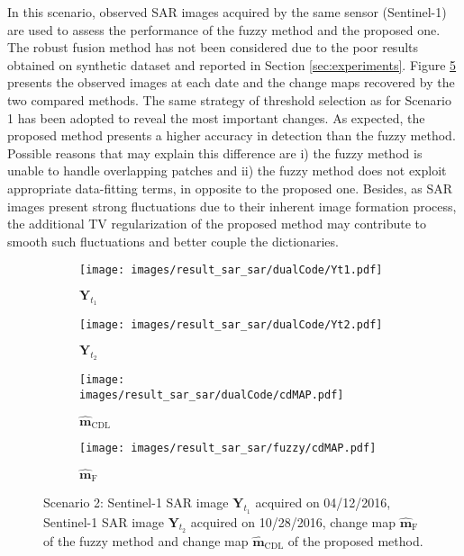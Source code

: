 \documentclass[review]{elsarticle}
\begin{document}
In this scenario, observed SAR images acquired by the same sensor (Sentinel-1) are used to assess the performance of the fuzzy method and the proposed one. The robust fusion method has not been considered due to the poor results obtained on synthetic dataset and reported in Section \ref{sec:experiments}. Figure \ref{fig:realS1S1} presents the observed images at each date and the change maps recovered by the two compared methods. The same strategy of threshold selection as for Scenario 1 has been adopted to reveal the most important changes. As expected, the proposed method presents a higher accuracy in detection than the fuzzy method. Possible reasons that may explain this difference are i) the fuzzy method is unable to handle overlapping patches and ii) the fuzzy method does not exploit appropriate data-fitting terms, in opposite to the proposed one. Besides, as SAR images present strong fluctuations due to their inherent image formation process, the additional TV regularization of the proposed method may contribute to smooth such fluctuations and better couple the dictionaries.

	\begin{figure}[h!]
		\centering
			\begin{subfigure}{\subfwidth}
					\centering
					\texttt{[image: images/result\_sar\_sar/dualCode/Yt1.pdf]}
					\caption{$\mathbf{Y}_{t_1}$}
					\label{fig:s1s1Yt1}
			\end{subfigure}
			\begin{subfigure}{\subfwidth}
					\centering
					\texttt{[image: images/result\_sar\_sar/dualCode/Yt2.pdf]}
					\caption{$\mathbf{Y}_{t_2}$}
					\label{fig:s1s1Yt2}
			\end{subfigure}
			\begin{subfigure}{\subfwidth}
					\centering
					\texttt{[image: images/result\_sar\_sar/dualCode/cdMAP.pdf]}
					\caption{$\hat{\mathbf{m}}_{\mathrm{CDL}}$}
					\label{fig:s1s1DCMAP}
			\end{subfigure}
			\begin{subfigure}{\subfwidth}
					\centering
					\texttt{[image: images/result\_sar\_sar/fuzzy/cdMAP.pdf]}
					\caption{$\hat{\mathbf{m}}_{\mathrm{F}}$}
					\label{fig:s1s1FMAP}
			\end{subfigure}
\caption{Scenario 2: \protect{}  Sentinel-1 SAR image  $\mathbf{Y}_{t_1}$ acquired on 04/12/2016, \protect{}  Sentinel-1 SAR image $\mathbf{Y}_{t_2}$ acquired on 10/28/2016, \protect{} change map $\hat{\mathbf{m}}_{\mathrm{F}}$ of the fuzzy method and \protect{} change map $\hat{\mathbf{m}}_{\mathrm{CDL}}$ of the proposed method.}%
	\label{fig:realS1S1}%
\end{figure}
\end{document}
